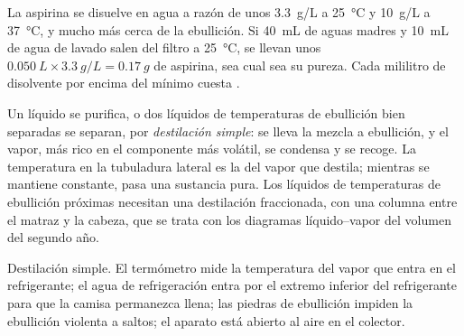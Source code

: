 \begin{example}
La aspirina se disuelve en agua a razón de unos \qty{3.3}{g/L} a
\qty{25}{\celsius} y \qty{10}{g/L} a \qty{37}{\celsius}, y mucho más cerca
de la ebullición. Si \qty{40}{mL} de aguas madres y \qty{10}{mL} de agua
de lavado salen del filtro a \qty{25}{\celsius}, se llevan unos
$\qty{0.050}{L} \times \qty{3.3}{g/L} = \qty{0.17}{g}$ de aspirina, sea
cual sea su pureza. Cada mililitro de disolvente por encima del mínimo
cuesta .
\end{example}

Un líquido se purifica, o dos líquidos de temperaturas de ebullición bien
separadas se separan, por \emph{destilación simple}: se lleva la mezcla a
ebullición, y el vapor, más rico en el componente más volátil, se
condensa y se recoge. La temperatura en la tubuladura lateral es la del
vapor que destila; mientras se mantiene constante, pasa una sustancia
pura. Los líquidos de temperaturas de ebullición próximas necesitan una
destilación fraccionada, con una columna entre el matraz y la cabeza, que
se trata con los diagramas líquido--vapor del volumen del segundo año.

\begin{omfigure}

{\small Destilación simple. El termómetro mide la temperatura del vapor
que entra en el refrigerante; el agua de refrigeración entra por el
extremo inferior del refrigerante para que la camisa permanezca llena;
las piedras de ebullición impiden la ebullición violenta a saltos; el
aparato está abierto al aire en el colector.}
\end{omfigure}

